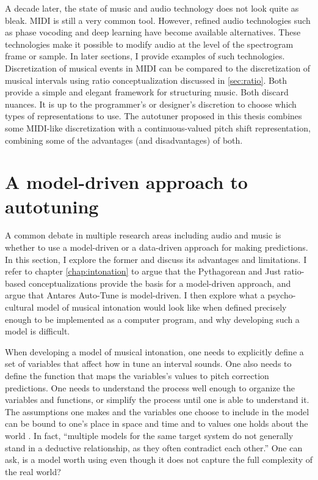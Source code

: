 A decade later, the state of music and audio technology does not look quite as bleak. MIDI is still a very common tool. However, refined audio technologies such as phase vocoding and deep learning have become available alternatives. These technologies make it possible to modify audio at the level of the spectrogram frame or sample. In later sections, I provide examples of such technologies. Discretization of musical events in MIDI can be compared to the discretization of musical intervals using ratio conceptualization discussed in \ref{sec:ratio}. Both provide a simple and elegant framework for structuring music. Both discard nuances. It is up to the programmer's or designer's discretion to choose which types of representations to use. The autotuner proposed in this thesis combines some MIDI-like discretization with a continuous-valued pitch shift representation, combining some of the advantages (and disadvantages) of both.

\section{A model-driven approach to autotuning}
A common debate in multiple research areas including audio and music is whether to use a model-driven or a data-driven approach for making predictions. In this section, I explore the former and discuss its advantages and limitations. I refer to chapter \ref{chap:intonation} to argue that the Pythagorean and Just ratio-based conceptualizations provide the basis for a model-driven approach, and argue that Antares Auto-Tune is model-driven. I then explore what a psycho-cultural model of musical intonation \cite{parncutt2018psychocultural} would look like when defined precisely enough to be implemented as a computer program, and why developing such a model is difficult. 

When developing a model of musical intonation, one needs to explicitly define a set of variables that affect how in tune an interval sounds. One also needs to define the function that maps the variables's values to pitch correction predictions. One needs to understand the process well enough to organize the variables and functions, or simplify the process until one is able to understand it. The assumptions one makes and the variables one choose to include in the model can be bound to one's place in space and time and to values one holds about the world \cite{bacharach1989organizational}. In fact, ``multiple models for the same target system do not generally stand in a deductive relationship, as they often contradict each other.'' \cite{sep-models-science} One can ask, is a model worth using even though it does not capture the full complexity of the real world? 

